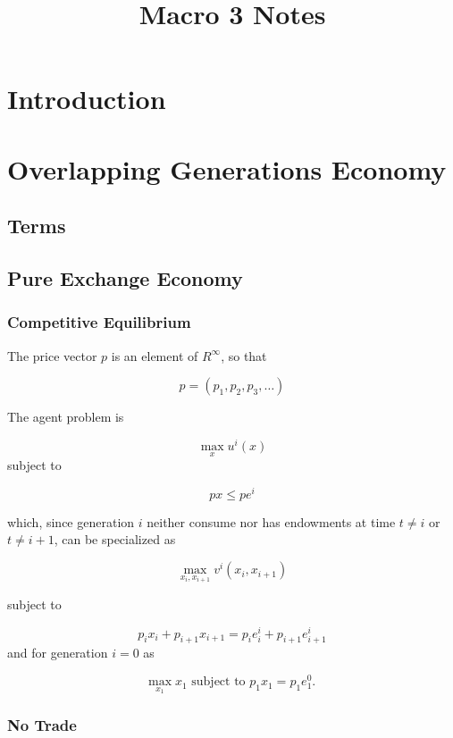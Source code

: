 \documentclass[10pt]{article}
\title{Macro 3 Notes}
\author{}
\date{}
\begin{document}
\maketitle

\tableofcontents

\section{Introduction}

\section{Overlapping Generations Economy}

\subsection{Terms}



\subsection{Pure Exchange Economy}

\subsubsection{Competitive Equilibrium}

The price vector $p$ is an element of $R^{\infty}$, so that

$$
p=\left(p_1, p_2, p_3, \ldots\right)
$$

The agent problem is

$$
\max _x u^i(x)
$$
subject to

$$
p x \leq p e^i
$$

which, since generation $i$ neither consume nor has endowments at time $t \neq i$ or $t \neq i+1$, can be specialized as

$$
\max _{x_i, x_{i+1}} v^i\left(x_i, x_{i+1}\right)
$$

subject to

$$
p_i x_i+p_{i+1} x_{i+1}=p_i e_i^i+p_{i+1} e_{i+1}^i
$$
and for generation $i=0$ as

$$
\max _{x_1} x_1 \text { subject to } p_1 x_1=p_1 e_1^0 \text {. }
$$

\subsubsection{No Trade}
\end{document}
